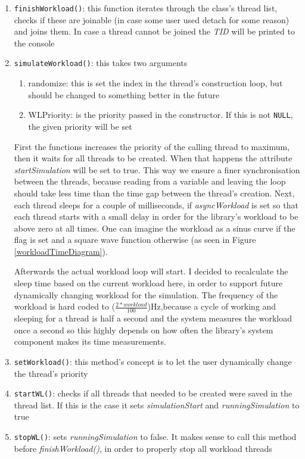 \begin{enumerate}
	\item \texttt{finishWorkload()}: this function iterates through the class's thread list, checks if these are joinable (in case some user used detach for some reason) and joins them. In case a thread cannot be joined the \textit{TID} will be printed to the console
	\item \texttt{simulateWorkload()}: this takes two arguments
	\begin{enumerate}
		\item randomize: this is set the index in the thread's construction loop, but should be changed to something better in the future
		\item WLPriority: is the priority passed in the constructor. If this is not \texttt{NULL}, the given priority will be set
	\end{enumerate}
	First the functions increases the priority of the calling thread to maximum, then it waits for all threads to be created. When that happens the attribute \textit{startSimulation} will be set to true. This way we ensure a finer synchronisation between the threads, because reading from a variable and leaving the loop should take less time than the time gap between the thread's creation. Next, each thread sleeps for a couple of milliseconds, if \textit{asyncWorkload} is set so that each thread starts with a small delay in order for the library's workload to be above zero at all times. One can imagine the workload as a sinus curve if the flag is set and a square wave function otherwise (as seen in Figure \ref*{workloadTimeDiagram}).
	\begin{figure*}[!htb]
		\centering
		\caption{Workload Time Diagrams} 
		\label{workloadTimeDiagram}
	\end{figure*}
	Afterwards the actual workload loop will start. I decided to recalculate the sleep time based on the current workload here, in order to support future dynamically changing workload for the simulation. The frequency of the workload is hard coded to ($\frac{2*workload}{100}$)Hz,because a cycle of working and sleeping for a thread is half a second and the system measures the workload once a second so this highly depends on how often the library's system component makes its time measurements.	
	\item \texttt{setWorkload()}: this method's concept is to let the user dynamically change the thread's priority 
	\item \texttt{startWL()}: checks if all threads that needed to be created were saved in the thread list. If this is the case it sets \textit{simulationStart} and \textit{runningSimulation} to true
	\item \texttt{stopWL()}: sets \textit{runningSimulation} to false. It makes sense to call this method before \textit{finishWorkload()}, in order to properly stop all workload threads
\end{enumerate}\newpage
